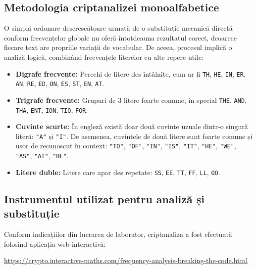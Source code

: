 \documentclass{labreport}
\begin{document}
\subsection{Metodologia criptanalizei monoalfabetice}

O simplă ordonare descrescătoare urmată de o substituție mecanică directă conform frecvențelor globale nu oferă întotdeauna rezultatul corect, deoarece fiecare text are propriile variații de vocabular. De aceea, procesul implică o analiză logică, combinând frecvențele literelor cu alte repere utile:
\begin{itemize}[noitemsep, topsep=2pt]
    \item \textbf{Digrafe frecvente:} Perechi de litere des întâlnite, cum ar fi \texttt{TH}, \texttt{HE}, \texttt{IN}, \texttt{ER}, \texttt{AN}, \texttt{RE}, \texttt{ED}, \texttt{ON}, \texttt{ES}, \texttt{ST}, \texttt{EN}, \texttt{AT}.
    \item \textbf{Trigrafe frecvente:} Grupuri de 3 litere foarte comune, în special \texttt{THE}, \texttt{AND}, \texttt{THA}, \texttt{ENT}, \texttt{ION}, \texttt{TIO}, \texttt{FOR}.
    \item \textbf{Cuvinte scurte:} În engleză există doar două cuvinte uzuale dintr-o singură literă: \texttt{"A"} și \texttt{"I"}. De asemenea, cuvintele de două litere sunt foarte comune și ușor de recunoscut în context: \texttt{"TO"}, \texttt{"OF"}, \texttt{"IN"}, \texttt{"IS"}, \texttt{"IT"}, \texttt{"HE"}, \texttt{"WE"}, \texttt{"AS"}, \texttt{"AT"}, \texttt{"BE"}.
    \item \textbf{Litere duble:} Litere care apar des repetate: \texttt{SS}, \texttt{EE}, \texttt{TT}, \texttt{FF}, \texttt{LL}, \texttt{OO}.
\end{itemize}

\subsection{Instrumentul utilizat pentru analiză și substituție}

Conform indicațiilor din lucrarea de laborator, criptanaliza a fost efectuată folosind aplicația web interactivă:
\begin{center}
    \url{https://crypto.interactive-maths.com/frequency-analysis-breaking-the-code.html}
\end{center}
\end{document}
